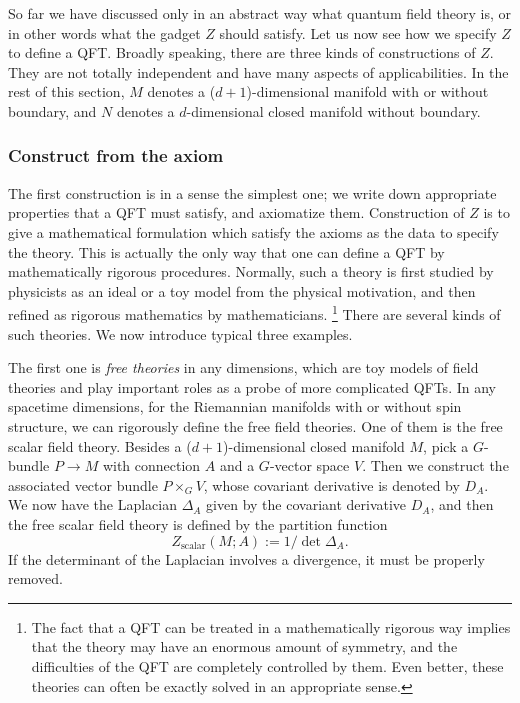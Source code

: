 So far we have discussed only in an abstract way what quantum field
theory is, or in other words what the gadget $Z$ should satisfy.
Let us now see how we specify $Z$ to define a QFT. Broadly speaking,
there are three kinds of constructions of $Z$. They are not totally
independent and have many aspects of applicabilities. In the rest
of this section, $M$ denotes a ($d+1$)-dimensional manifold with
or without boundary, and $N$ denotes a $d$-dimensional closed manifold
without boundary. 

\subsubsection*{Construct from the axiom}

The first construction is in a sense the simplest one; we write down
appropriate properties that a QFT must satisfy, and axiomatize them.
Construction of $Z$ is to give a mathematical formulation which satisfy
the axioms as the data to specify the theory. This is actually the
only way that one can define a QFT by mathematically rigorous procedures.
Normally, such a theory is first studied by physicists as an ideal
or a toy model from the physical motivation, and then refined as rigorous
mathematics by mathematicians.%
%
\footnote{The fact that a QFT can be treated in a mathematically rigorous way
implies that the theory may have an enormous amount of symmetry, and
the difficulties of the QFT are completely controlled by them. Even
better, these theories can often be exactly solved in an appropriate
sense.}
%
 There are several kinds of such theories. We now introduce typical
three examples. 

The first one is \emph{free theories} in any dimensions, which are
toy models of field theories and play important roles as a probe of
more complicated QFTs. In any spacetime dimensions, for the Riemannian
manifolds with or without spin structure, we can rigorously define
the free field theories. One of them is the free scalar field theory.
Besides a ($d+1$)-dimensional closed manifold $M$, pick a $G$-bundle
$P\rightarrow M$ with connection $A$ and a $G$-vector space $V$.
Then we construct the associated vector bundle $P\times_{G}V$, whose
covariant derivative is denoted by $D_{A}$. We now have the Laplacian
$\Delta_{A}$ given by the covariant derivative $D_{A}$, and then
the free scalar field theory is defined by the partition function
\begin{equation}
  Z_{\mathrm{scalar}}\left(M;A\right)  :=  1/\det\Delta_{A}.
\end{equation}
 If the determinant of the Laplacian involves a divergence, it must
be properly removed. 

